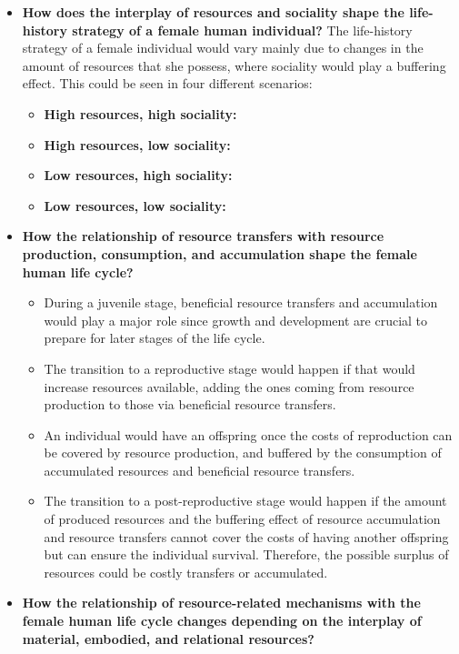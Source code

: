 \documentclass{article}
\begin{document}
\begin{itemize}
    \item \textbf{How does the interplay of resources and sociality shape the life-history strategy of a female human individual?} The life-history strategy of a female individual would vary mainly due to changes in the amount of resources that she possess, where sociality would play a buffering effect. This could be seen in four different scenarios:
        \begin{itemize}
        \item \textbf{High resources, high sociality:} 
        \item \textbf{High resources, low sociality:}
        \item \textbf{Low resources, high sociality:}
        \item \textbf{Low resources, low sociality:}
    \end{itemize}
\item \textbf{How the relationship of resource transfers with resource production, consumption, and accumulation shape the female human life cycle?}
    \begin{itemize}
        \item During a juvenile stage, beneficial resource transfers and accumulation would play a major role since growth and development are crucial to prepare for later stages of the life cycle.
        \item The transition to a reproductive stage would happen if that would increase resources available, adding the ones coming from resource production to those via beneficial resource transfers.
        \item An individual would have an offspring once the costs of reproduction can be covered by resource production, and buffered by the consumption of accumulated resources and beneficial resource transfers.
        \item The transition to a post-reproductive stage would happen if the amount of produced resources and the buffering effect of resource accumulation and resource transfers cannot cover the costs of having another offspring but can ensure the individual survival. Therefore, the possible surplus of resources could be costly transfers or accumulated.
    \end{itemize}
\item \textbf{How the relationship of resource-related mechanisms with the female human life cycle changes depending on the interplay of material, embodied, and relational resources?}

\end{itemize}
\end{document}
